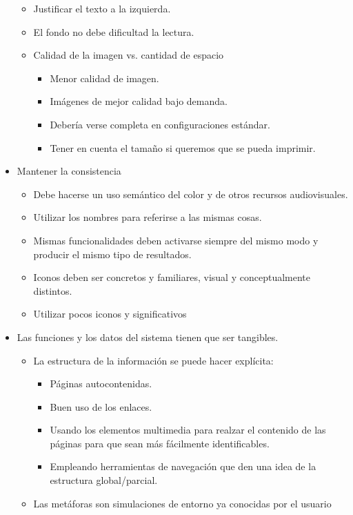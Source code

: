 \documentclass[12pt, twoside, openright]{report} %
\begin{document}
\begin{itemize}
\begin{itemize}
  \item Justificar el texto a la izquierda.
  \item El fondo no debe dificultad la lectura.
  \item  Calidad de la imagen vs. cantidad de espacio
  \begin{itemize}
    \item Menor calidad de imagen.
    \item Imágenes de mejor calidad bajo demanda.
    \item Debería verse completa en configuraciones estándar.
    \item Tener en cuenta el tamaño si queremos que se pueda imprimir.
  \end{itemize}

\end{itemize}
  
    \item
      Mantener la consistencia

      \begin{itemize}
      
      \item
        Debe hacerse un uso semántico del color y de otros recursos
        audiovisuales.
      \item
        Utilizar los nombres para referirse a las mismas cosas.
      \item
        Mismas funcionalidades deben activarse siempre del mismo modo y
        producir el mismo tipo de resultados.
      \item
        Iconos deben ser concretos y familiares, visual y
        conceptualmente distintos.
      \item
        Utilizar pocos iconos y significativos
      \end{itemize}
    \item
      Las funciones y los datos del sistema tienen que ser tangibles.

      \begin{itemize}
      
      \item
        La estructura de la información se puede hacer explícita:

        \begin{itemize}
        
        \item
          Páginas autocontenidas.
        \item
          Buen uso de los enlaces.
        \item
          Usando los elementos multimedia para realzar el contenido de
          las páginas para que sean más fácilmente identificables.
        \item
          Empleando herramientas de navegación que den una idea de la
          estructura global/parcial.
        \end{itemize}
      \item
        Las metáforas son simulaciones de entorno ya conocidas por el
        usuario
      

\end{itemize}
\end{itemize}
\end{document}
